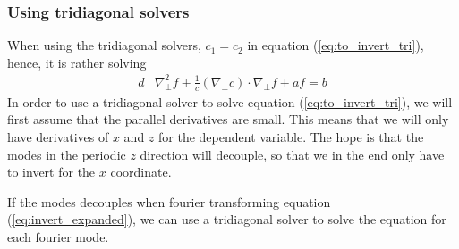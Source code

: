 \documentclass[12pt]{article}
\newcommand{\Grad}{\ensuremath{\nabla}}
\begin{document}
\subsubsection{Using tridiagonal solvers}
%
When using the tridiagonal solvers, $c_1 = c_2$ in equation
(\ref{eq:to_invert_tri}), hence, it is rather solving
%
%
\begin{align}
    d&\Grad_\perp^2f + \frac{1}{c}(\Grad_\perp c)\cdot\Grad_\perp f + af = b
    \label{eq:to_invert_tri}
\end{align}
%
%
In order to use a tridiagonal solver to solve equation
(\ref{eq:to_invert_tri}), we will first assume that the parallel derivatives
are small. This means that we will only have derivatives of $x$ and $z$ for the
dependent variable. The hope is that the modes in the periodic $z$ direction
will decouple, so that we in the end only have to invert for the $x$
coordinate.

If the modes decouples when fourier transforming equation
(\ref{eq:invert_expanded}), we can use a tridiagonal solver to solve the
equation for each fourier mode.
\end{document}
